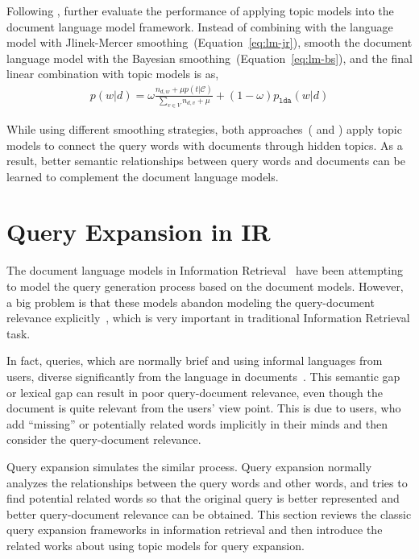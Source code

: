 
Following \cite{wei-06}, \cite{Lu-2011} further evaluate the performance of applying topic models into the document language model framework. Instead of combining with the language model with Jlinek-Mercer smoothing~(Equation~\ref{eq:lm-jr}), \cite{Lu-2011} smooth the document language model with the Bayesian smoothing~(Equation~\ref{eq:lm-bs}), and the final linear combination with topic models is as,
\begin{align}
p(w|d) = \omega \frac{n_{d,w} + \mu p(t|\mathcal{C})}{\sum_{v \in V} n_{d,v} + \mu}  + (1 - \omega) p_{\texttt{lda}}(w|d)
\end{align}

While using different smoothing strategies, both approaches~(\citep{wei-06} and \citep{Lu-2011}) apply topic models to connect the query words with documents through hidden topics. As a result, better semantic relationships between query words and documents can be learned to complement the document language models.

\section{Query Expansion in IR}

The document language models in Information Retrieval~\citep{PonteCroft} have been attempting to model the query generation process based on the document models. However, a big problem is that these models abandon modeling the query-document relevance explicitly~\citep{Lavrenko-2001}, which is very important in traditional Information Retrieval task.

In fact, queries, which are normally brief and using informal languages from users, diverse significantly from the language in documents~\citep{Muller-2009}. This semantic gap or lexical gap can result in poor query-document relevance, even though the document is quite relevant from the users' view point. This is due to users, who add ``missing'' or potentially related words implicitly in their minds and then consider the query-document relevance.

Query expansion simulates the similar process. Query expansion normally analyzes the relationships between the query words and other words, and tries to find potential related words so that the original query is better represented and better query-document relevance can be obtained. This section reviews the classic query expansion frameworks in information retrieval and then introduce the related works about using topic models for query expansion.

